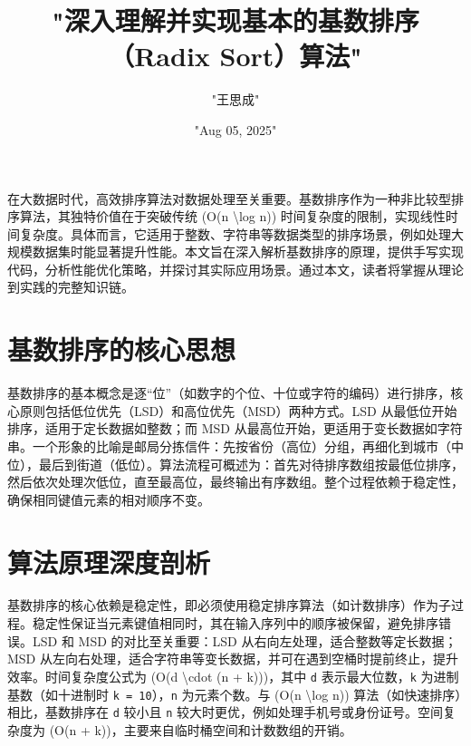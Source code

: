 \title{"深入理解并实现基本的基数排序（Radix Sort）算法"}
\author{"王思成"}
\date{"Aug 05, 2025"}
\maketitle
在大数据时代，高效排序算法对数据处理至关重要。基数排序作为一种非比较型排序算法，其独特价值在于突破传统 (O(n \textbackslash{}log n)) 时间复杂度的限制，实现线性时间复杂度。具体而言，它适用于整数、字符串等数据类型的排序场景，例如处理大规模数据集时能显著提升性能。本文旨在深入解析基数排序的原理，提供手写实现代码，分析性能优化策略，并探讨其实际应用场景。通过本文，读者将掌握从理论到实践的完整知识链。\par
\chapter{基数排序的核心思想}
基数排序的基本概念是逐“位”（如数字的个位、十位或字符的编码）进行排序，核心原则包括低位优先（LSD）和高位优先（MSD）两种方式。LSD 从最低位开始排序，适用于定长数据如整数；而 MSD 从最高位开始，更适用于变长数据如字符串。一个形象的比喻是邮局分拣信件：先按省份（高位）分组，再细化到城市（中位），最后到街道（低位）。算法流程可概述为：首先对待排序数组按最低位排序，然后依次处理次低位，直至最高位，最终输出有序数组。整个过程依赖于稳定性，确保相同键值元素的相对顺序不变。\par
\chapter{算法原理深度剖析}
基数排序的核心依赖是稳定性，即必须使用稳定排序算法（如计数排序）作为子过程。稳定性保证当元素键值相同时，其在输入序列中的顺序被保留，避免排序错误。LSD 和 MSD 的对比至关重要：LSD 从右向左处理，适合整数等定长数据；MSD 从左向右处理，适合字符串等变长数据，并可在遇到空桶时提前终止，提升效率。时间复杂度公式为 (O(d \textbackslash{}cdot (n + k)))，其中 \texttt{d} 表示最大位数，\texttt{k} 为进制基数（如十进制时 \texttt{k = 10}），\texttt{n} 为元素个数。与 (O(n \textbackslash{}log n)) 算法（如快速排序）相比，基数排序在 \texttt{d} 较小且 \texttt{n} 较大时更优，例如处理手机号或身份证号。空间复杂度为 (O(n + k))，主要来自临时桶空间和计数数组的开销。\par
